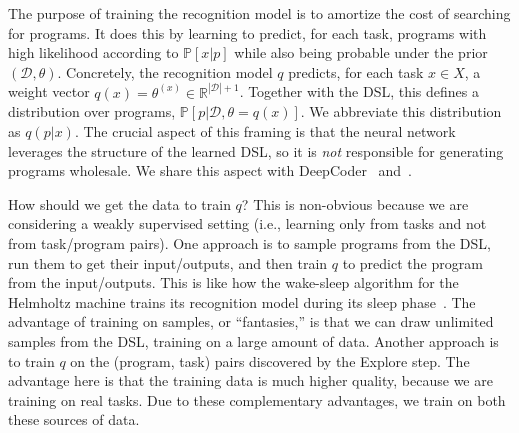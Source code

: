 \documentclass{article}
\newcommand{\probability}{\mathds{P}} %
\begin{document}
The purpose of training the recognition model is to amortize the cost of searching for
programs.  It does this by learning to predict, for each task,
programs with high likelihood according to 
$\probability[x|p]$ while also being
probable under the prior $(\mathcal{D},\theta)$.  Concretely,
the recognition model $q$ predicts, for each
task $x\in X$, a weight vector $q(x) = \theta^{(x)}\in
\mathbb{R}^{|\mathcal{D}| + 1}$.  Together with the DSL, this defines
a distribution over programs, $\probability[p|\mathcal{D},\theta =
  q(x)]$.  We abbreviate this distribution as $q(p|x)$.  The crucial
aspect of this framing is that the neural network leverages the
structure of the learned DSL, so it is \emph{not} responsible for
generating programs wholesale.  We share this aspect with
DeepCoder~\cite{balog2016deepcoder} and~\cite{menon2013machine}.

How should we get the data to train $q$?
This is non-obvious  because we are considering a weakly supervised setting (i.e., learning only from tasks and not from task/program pairs).
One approach is to sample programs from the DSL,
run them to get their input/outputs,
and then train $q$ to predict the program from the input/outputs.
This is like how the wake-sleep algorithm for the Helmholtz machine
trains its recognition model during its sleep phase~\cite{dayan1995helmholtz}.
The advantage of training on samples, or ``fantasies,'' is that
we can draw unlimited samples from the DSL,
training on a large amount of data.
Another approach is
to train $q$ on the (program, task)
pairs discovered by the Explore step.
The advantage here
is that the training data is much higher quality,
because we are training on real tasks.
Due to these complementary advantages,
we train on both these sources of data.
\end{document}
